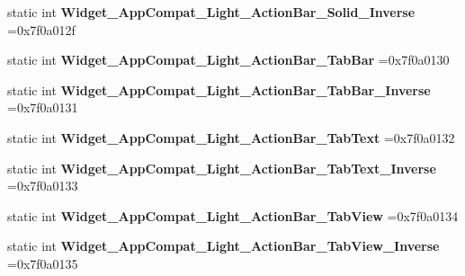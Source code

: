 \begin{DoxyCompactItemize}
static int {\bfseries Widget\+\_\+\+App\+Compat\+\_\+\+Light\+\_\+\+Action\+Bar\+\_\+\+Solid\+\_\+\+Inverse} =0x7f0a012f
\item 
\mbox{\label{classandroid_1_1support_1_1graphics_1_1drawable_1_1animated_1_1R_1_1style_ac0ef9bf7e1a407b934b89ecfb9ee016e}} 
static int {\bfseries Widget\+\_\+\+App\+Compat\+\_\+\+Light\+\_\+\+Action\+Bar\+\_\+\+Tab\+Bar} =0x7f0a0130
\item 
\mbox{\label{classandroid_1_1support_1_1graphics_1_1drawable_1_1animated_1_1R_1_1style_a0d8e75c6c2dfbfad8de06a72b18687d3}} 
static int {\bfseries Widget\+\_\+\+App\+Compat\+\_\+\+Light\+\_\+\+Action\+Bar\+\_\+\+Tab\+Bar\+\_\+\+Inverse} =0x7f0a0131
\item 
\mbox{\label{classandroid_1_1support_1_1graphics_1_1drawable_1_1animated_1_1R_1_1style_a897f46fc5f230056e6848d16f38b2dc4}} 
static int {\bfseries Widget\+\_\+\+App\+Compat\+\_\+\+Light\+\_\+\+Action\+Bar\+\_\+\+Tab\+Text} =0x7f0a0132
\item 
\mbox{\label{classandroid_1_1support_1_1graphics_1_1drawable_1_1animated_1_1R_1_1style_a3f11ba32631532493bb82104a61732ae}} 
static int {\bfseries Widget\+\_\+\+App\+Compat\+\_\+\+Light\+\_\+\+Action\+Bar\+\_\+\+Tab\+Text\+\_\+\+Inverse} =0x7f0a0133
\item 
\mbox{\label{classandroid_1_1support_1_1graphics_1_1drawable_1_1animated_1_1R_1_1style_ac9460352f33d63a08c86be0a032ce305}} 
static int {\bfseries Widget\+\_\+\+App\+Compat\+\_\+\+Light\+\_\+\+Action\+Bar\+\_\+\+Tab\+View} =0x7f0a0134
\item 
\mbox{\label{classandroid_1_1support_1_1graphics_1_1drawable_1_1animated_1_1R_1_1style_ac9a848377c2ccee2d0cf06ebf2fa9d36}} 
static int {\bfseries Widget\+\_\+\+App\+Compat\+\_\+\+Light\+\_\+\+Action\+Bar\+\_\+\+Tab\+View\+\_\+\+Inverse} =0x7f0a0135
\item 

\end{DoxyCompactItemize}
